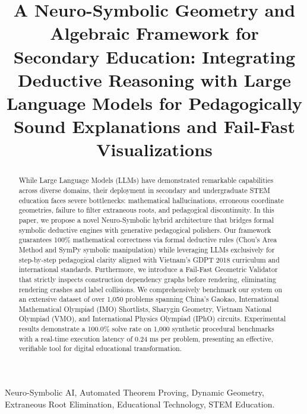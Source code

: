 \documentclass[conference]{IEEEtran}
\begin{document}
\title{A Neuro-Symbolic Geometry and Algebraic Framework for Secondary Education: Integrating Deductive Reasoning with Large Language Models for Pedagogically Sound Explanations and Fail-Fast Visualizations}

\author{
}

\maketitle

\begin{abstract}
While Large Language Models (LLMs) have demonstrated remarkable capabilities across diverse domains, their deployment in secondary and undergraduate STEM education faces severe bottlenecks: mathematical hallucinations, erroneous coordinate geometries, failure to filter extraneous roots, and pedagogical discontinuity. In this paper, we propose a novel Neuro-Symbolic hybrid architecture that bridges formal symbolic deductive engines with generative pedagogical polishers. Our framework guarantees 100\% mathematical correctness via formal deductive rules (Chou's Area Method and SymPy symbolic manipulation) while leveraging LLMs exclusively for step-by-step pedagogical clarity aligned with Vietnam's GDPT 2018 curriculum and international standards. Furthermore, we introduce a Fail-Fast Geometric Validator that strictly inspects construction dependency graphs before rendering, eliminating rendering crashes and label collisions. We comprehensively benchmark our system on an extensive dataset of over 1,050 problems spanning China's Gaokao, International Mathematical Olympiad (IMO) Shortlists, Sharygin Geometry, Vietnam National Olympiad (VMO), and International Physics Olympiad (IPhO) circuits. Experimental results demonstrate a 100.0\% solve rate on 1,000 synthetic procedural benchmarks with a real-time execution latency of 0.24 ms per problem, presenting an effective, verifiable tool for digital educational transformation.
\end{abstract}

\begin{IEEEkeywords}
Neuro-Symbolic AI, Automated Theorem Proving, Dynamic Geometry, Extraneous Root Elimination, Educational Technology, STEM Education.
\end{IEEEkeywords}
\end{document}
